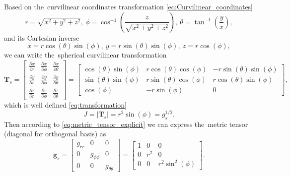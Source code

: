 \documentclass[preprint,12pt]{elsarticle}
\newcommand{\pdv}[2]{\frac{\partial{#1}}{\partial{#2}}}
\newcommand{\matr}[1]{\mathbf{#1}}
\begin{document}
Based on the~curvilinear coordinates transformation 
\eqref{eq:Curvilinear_coordinates}
\begin{equation}
  r = \sqrt{x^2 + y^2 + z^2} ,~ 
  \phi = \cos^{-1} \left( \frac{z}{\sqrt{x^2 + y^2 + z^2}} \right),~
  \theta = \tan^{-1}\left( \frac{y}{x} \right) ,
  \label{eq:spher_curvilinear_transformation}
\end{equation}
and its Cartesian inverse
\begin{equation}
  x = r \cos(\theta)\sin(\phi) ,~ 
  y = r \sin(\theta)\sin(\phi) ,~ 
  z = r \cos(\phi),
  \label{eq:spher_Cartesian_transformation}
\end{equation}
we can write the~spherical curvilinear transformation
\begin{equation}
  \matr{T}_{s} = \begin{bmatrix}
        \pdv{x}{r} & \pdv{x}{\phi} & \pdv{x}{\theta} \\
        \pdv{y}{r} & \pdv{y}{\phi} & \pdv{y}{\theta} \\
        \pdv{z}{r} & \pdv{z}{\phi} & \pdv{z}{\theta} 
	  \end{bmatrix}
  = \begin{bmatrix}
  \cos(\theta)\sin(\phi) & r\cos(\theta)\cos(\phi) & -r\sin(\theta)\sin(\phi) \\
  \sin(\theta)\sin(\phi) & r\sin(\theta)\cos(\phi) & r\cos(\theta)\sin(\phi) \\
  \cos(\phi) & -r\sin(\phi) & 0  
  \end{bmatrix} ,
  \label{eq:spher_transformation}
\end{equation}
which is well defined \eqref{eq:transformation}
\begin{equation}
  J = |\matr{T}_{s}| = r^2\sin(\phi) = g_s^{1/2}.
  \label{eq:spher_J}
\end{equation}
Then according to \eqref{eq:metric_tensor_explicit} we can express the~metric
tensor (diagonal for orthogonal basis) as
\begin{equation}
  \matr{g}_s = \begin{bmatrix}
                 g_{rr} & 0 & 0 \\
			     0 & g_{\phi\phi} & 0 \\
			     0 & 0 & g_{\theta\theta}
			   \end{bmatrix}
             = \begin{bmatrix}
                 1 & 0 & 0 \\
			     0 & r^2 & 0 \\
			     0 & 0 & r^2\sin^2(\phi)
			   \end{bmatrix} .
  \label{eq:spher_metric_tensor}		   
\end{equation}
\end{document}

